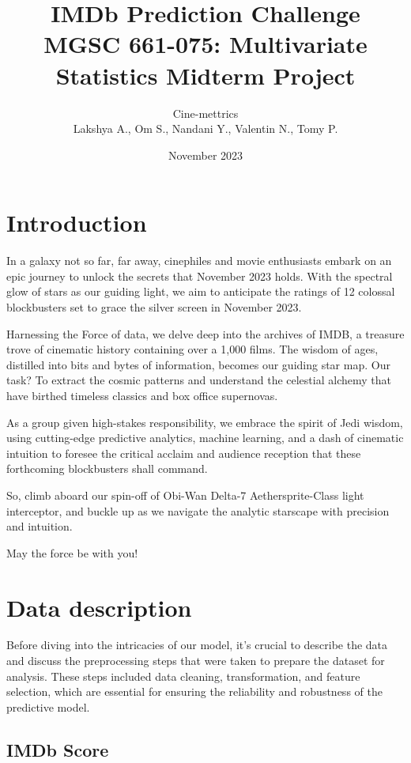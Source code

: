 \documentclass[12pt,a4paper]{article}
\title{IMDb Prediction Challenge \\ \normalsize{MGSC 661-075: Multivariate Statistics Midterm Project}}
\author{Cine-mettrics \\ \normalsize{Lakshya A., Om S., Nandani Y., Valentin N., Tomy P.}}
\date{November 2023}
\begin{document}
\maketitle

\section{Introduction}\label{sec:intro}
In a galaxy not so far, far away, cinephiles and movie enthusiasts embark on an epic journey to unlock the secrets
that November 2023 holds. With the spectral glow of stars as our guiding light,
we aim to anticipate the ratings of 12 colossal blockbusters set to grace the silver screen in November 2023.

Harnessing the Force of data, we delve deep into the archives of IMDB,
a treasure trove of cinematic history containing over a 1,000 films.
The wisdom of ages, distilled into bits and bytes of information, becomes our guiding star map.
Our task? To extract the cosmic patterns and understand the
celestial alchemy that have birthed timeless classics and box office supernovas.

As a group given high-stakes responsibility, we embrace the spirit of Jedi wisdom, using cutting-edge predictive analytics,
machine learning, and a dash of cinematic intuition to foresee the critical acclaim and
audience reception that these forthcoming blockbusters shall command.

So, climb aboard our spin-off of Obi-Wan Delta-7 Aethersprite-Class light interceptor,
and buckle up as we navigate the analytic starscape with precision and intuition.

May the force be with you!

\section{Data description}\label{sec:data-description}
Before diving into the intricacies of our model, it's crucial to describe the data and discuss the
preprocessing steps that were taken to prepare the dataset for analysis.
These steps included data cleaning, transformation, and feature selection,
which are essential for ensuring the reliability and robustness of the predictive model.

\subsection{IMDb Score}\label{subsec:imdb-score}
\end{document}
